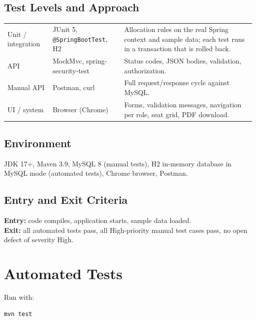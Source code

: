 \documentclass[11pt,a4paper]{article}
\begin{document}
\subsection{Test Levels and Approach}
\begin{tabularx}{\linewidth}{|L{3cm}|L{3.5cm}|X|}
\hline\headrow{} &  & \\\hline
Unit / integration & JUnit 5, \texttt{@SpringBootTest}, H2 & Allocation rules on the real Spring context and sample data; each test runs in a transaction that is rolled back.\\\hline
API & MockMvc, spring-security-test & Status codes, JSON bodies, validation, authorization.\\\hline
Manual API & Postman, curl & Full request/response cycle against MySQL.\\\hline
UI / system & Browser (Chrome) & Forms, validation messages, navigation per role, seat grid, PDF download.\\\hline
\end{tabularx}

\subsection{Environment}
JDK 17+, Maven 3.9, MySQL 8 (manual tests), H2 in-memory database in MySQL mode (automated tests), Chrome browser, Postman.

\subsection{Entry and Exit Criteria}
\textbf{Entry:} code compiles, application starts, sample data loaded.\\
\textbf{Exit:} all automated tests pass, all High-priority manual test cases pass, no open defect of severity High.

\section{Automated Tests}
Run with:
\begin{lstlisting}[style=bash]
mvn test
\end{lstlisting}
\end{document}
